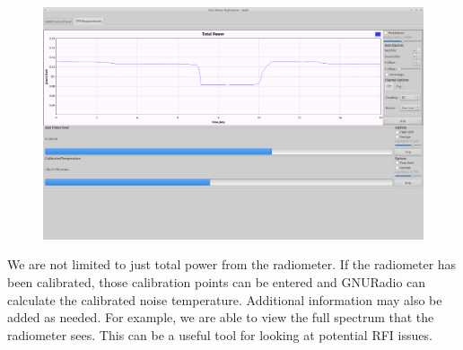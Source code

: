 {\begin{figure}[h!tb] 
\centering
\includegraphics[width=17cm]{Images/Lab1_TPR_at_end_exp.png}
\label{radiometer_tpr_display}
\end{figure}
}

We are not limited to just total power from the radiometer.  If the radiometer has been calibrated, those calibration points can be entered and GNURadio can calculate the calibrated noise temperature.  Additional information may also be added as needed.  For example, we are able to view the full spectrum that the radiometer sees.  This can be a useful tool for looking at potential RFI issues.  


